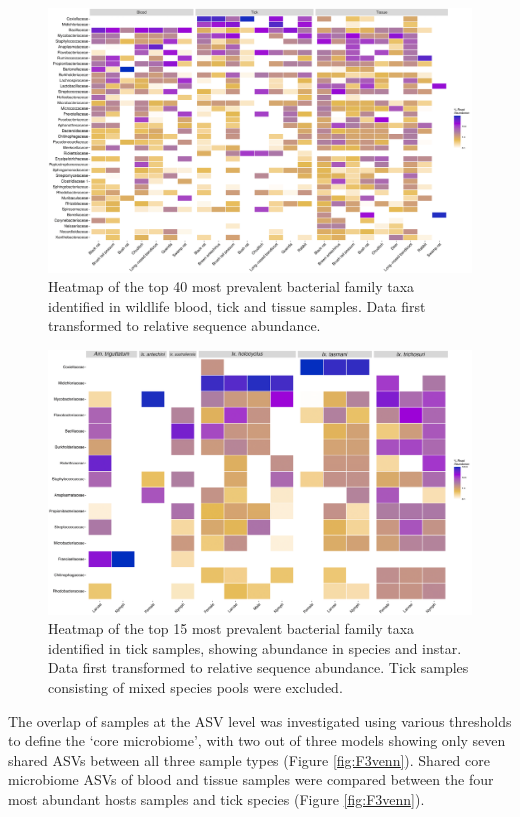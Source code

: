 \documentclass[a4paper, nobind]{templates/ociamthesis}
\begin{document}
\begin{figure}
\includegraphics[width=0.95\linewidth]{figures/ms-figs/Ch3-heatmap} \caption[Heatmap of bacterial family taxa in wildlife samples.]{Heatmap of the top 40 most prevalent bacterial family taxa identified in wildlife blood, tick and tissue samples. Data first transformed to relative sequence abundance.}\label{fig:F3heatmap}
\end{figure}

\begin{figure}
\includegraphics[width=0.95\linewidth]{figures/ms-figs/Ch3-heatmap-tick} \caption[Heatmap of bacterial family taxa in tick samples from wildlife.]{Heatmap of the top 15 most prevalent bacterial family taxa identified in tick samples, showing abundance in species and instar. Data first transformed to relative sequence abundance. Tick samples consisting of mixed species pools were excluded.}\label{fig:F3heatmaptick}
\end{figure}

The overlap of samples at the ASV level was investigated using various thresholds to define the `core microbiome', with two out of three models showing only seven shared ASVs between all three sample types (Figure \ref{fig:F3venn}).
Shared core microbiome ASVs of blood and tissue samples were compared between the four most abundant hosts samples and tick species (Figure \ref{fig:F3venn}).
\end{document}
